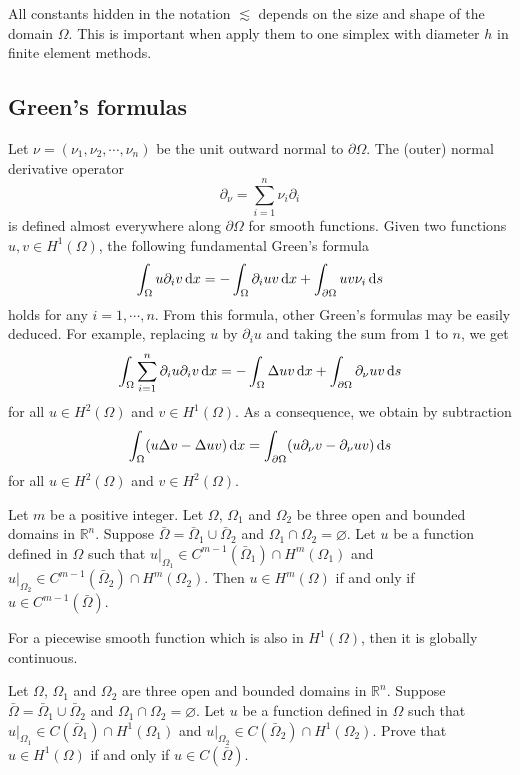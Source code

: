 All constants hidden in the notation $\lesssim$ depends on the size and shape of the domain
$\Omega$. This is important when apply them to one simplex with diameter $h$ in finite element
methods.

\subsection{Green's formulas}
Let $\nu=(\nu_1, \nu_2, \cdots, \nu_n)$ be the unit outward normal to $\partial\Omega$.
The (outer) normal derivative operator
\[
\partial_{\nu}=\sum_{i=1}^n\nu_i\partial_i
\]
is defined almost everywhere along $\partial\Omega$ for smooth functions.
Given two functions $u, v\in H^1(\Omega)$, the following fundamental Green's formula
\[
\int_{\Omega}u\partial_iv\,{\rm d}x=-\int_{\Omega}\partial_iuv\,{\rm d}x+\int_{\partial\Omega}uv\nu_i\,{\rm d} s
\]
holds for any $i=1, \cdots, n$.
From this formula, other Green's formulas may be easily deduced.
For example, replacing $u$ by $\partial_iu$ and taking the sum from $1$ to $n$, we get
\[
\int_{\Omega}\sum_{i=1}^n\partial_iu\partial_iv\,{\rm d}x=-\int_{\Omega}\Delta uv\,{\rm d}x+\int_{\partial\Omega}\partial_{\nu}uv\,{\rm d} s
\]
for all $u\in H^2(\Omega)$ and $v\in H^1(\Omega)$. As a consequence, we obtain by subtraction
\[
\int_{\Omega}(u\Delta v-\Delta uv)\,{\rm d}x=\int_{\partial\Omega}(u\partial_{\nu}v-\partial_{\nu}uv)\,{\rm d} s
\]
for all $u\in H^2(\Omega)$ and $v\in H^2(\Omega)$.


\begin{theorem}
Let $m$ be a positive integer. Let $\Omega$, $\Omega_1$ and $\Omega_2$ be three open and bounded domains in $\mathbb R^n$. Suppose
$\bar{\Omega}=\bar{\Omega}_1\cup \bar{\Omega}_2$ and $\Omega_1\cap \Omega_2=\varnothing$. Let $u$ be a function defined in
$\Omega$ such that $u|_{\Omega_1}\in C^{m-1}(\bar{\Omega}_1)\cap H^m(\Omega_1)$ and $u|_{\Omega_2}\in C^{m-1}(\bar{\Omega}_2)\cap H^m(\Omega_2)$.
Then $u\in H^m(\Omega)$ if and only if $u\in C^{m-1}(\bar{\Omega})$.
\end{theorem}
For a piecewise smooth function which is also in $H^1(\Omega)$, then it is globally continuous.
\begin{exe}
Let $\Omega$, $\Omega_1$ and $\Omega_2$ are three open and bounded domains in $\mathbb R^n$. Suppose
$\bar{\Omega}=\bar{\Omega}_1\cup \bar{\Omega}_2$ and $\Omega_1\cap \Omega_2=\varnothing$. Let $u$ be a function defined in
$\Omega$ such that $u|_{\Omega_1}\in C(\bar{\Omega}_1)\cap H^1(\Omega_1)$ and $u|_{\Omega_2}\in C(\bar{\Omega}_2)\cap H^1(\Omega_2)$.
Prove that $u\in H^1(\Omega)$ if and only if $u\in C(\bar{\Omega})$.
\end{exe}



